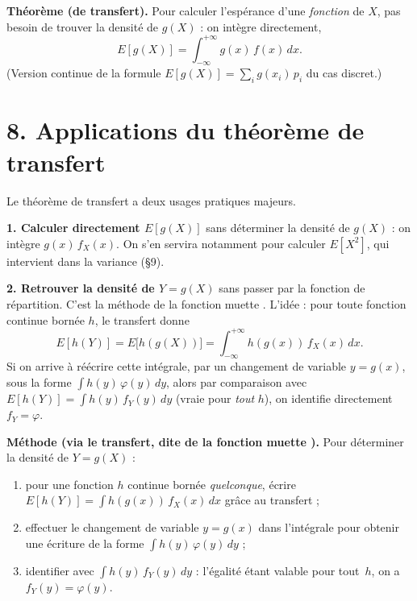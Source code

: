 \medskip

\textbf{Théorème (de transfert).}
Pour calculer l'espérance d'une \emph{fonction} de $X$, pas besoin
de trouver la densité de $g(X)$ : on intègre directement,
\[
  \boxed{\,E[g(X)]=\int_{-\infty}^{+\infty} g(x)\,f(x)\,dx.\,}
\]
(Version continue de la formule $E[g(X)]=\sum_i g(x_i)\,p_i$
du cas discret.)

\section*{8. Applications du théorème de transfert}

Le théorème de transfert a deux usages pratiques majeurs.

\medskip

\textbf{1. Calculer directement $E[g(X)]$} sans déterminer la densité
de $g(X)$ : on intègre $g(x)\,f_X(x)$. On s'en servira notamment
pour calculer $E[X^2]$, qui intervient dans la variance (§9).

\medskip

\textbf{2. Retrouver la densité de $Y=g(X)$} sans passer par la
fonction de répartition. C'est la \og méthode de la fonction muette \fg{}.
L'idée : pour toute fonction continue bornée $h$, le transfert donne
\[
  E[h(Y)] = E\bigl[h(g(X))\bigr]
  = \int_{-\infty}^{+\infty} h(g(x))\,f_X(x)\,dx.
\]
Si on arrive à réécrire cette intégrale, par un changement de variable
$y=g(x)$, sous la forme $\int h(y)\,\varphi(y)\,dy$, alors par
comparaison avec $E[h(Y)] = \int h(y)\,f_Y(y)\,dy$ (vraie pour
\emph{tout} $h$), on identifie directement $f_Y=\varphi$.

\begin{mdframed}[backgroundcolor=ThemeLight, linecolor=Theme,
  linewidth=1pt, innertopmargin=8pt, innerbottommargin=8pt, nobreak=true]
\textbf{Méthode (via le transfert, dite \og de la fonction muette \fg).}
Pour déterminer la densité de $Y=g(X)$ :
\begin{enumerate}
  \item pour une fonction $h$ continue bornée \emph{quelconque},
    écrire $E[h(Y)]=\int h(g(x))\,f_X(x)\,dx$ grâce au transfert ;
  \item effectuer le changement de variable $y=g(x)$ dans l'intégrale
    pour obtenir une écriture de la forme $\int h(y)\,\varphi(y)\,dy$ ;
  \item identifier avec $\int h(y)\,f_Y(y)\,dy$ : l'égalité étant
    valable pour tout~$h$, on a $f_Y(y)=\varphi(y)$.
\end{enumerate}
\end{mdframed}

